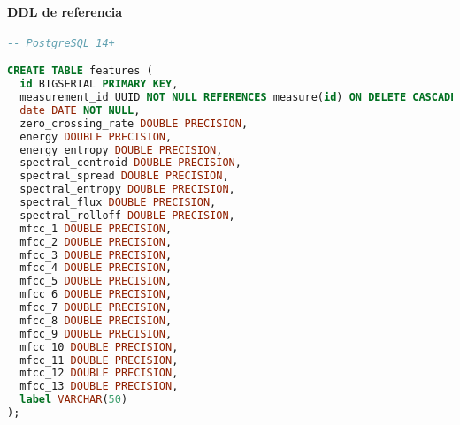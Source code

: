 \paragraph{DDL de referencia}

\begin{lstlisting}[language=SQL, label={lst:features-database-schema}, caption={Esquema de la tabla features en mind-database}]
-- PostgreSQL 14+

CREATE TABLE features (
  id BIGSERIAL PRIMARY KEY,
  measurement_id UUID NOT NULL REFERENCES measure(id) ON DELETE CASCADE,
  date DATE NOT NULL,
  zero_crossing_rate DOUBLE PRECISION,
  energy DOUBLE PRECISION,
  energy_entropy DOUBLE PRECISION,
  spectral_centroid DOUBLE PRECISION,
  spectral_spread DOUBLE PRECISION,
  spectral_entropy DOUBLE PRECISION,
  spectral_flux DOUBLE PRECISION,
  spectral_rolloff DOUBLE PRECISION,
  mfcc_1 DOUBLE PRECISION,
  mfcc_2 DOUBLE PRECISION,
  mfcc_3 DOUBLE PRECISION,
  mfcc_4 DOUBLE PRECISION,
  mfcc_5 DOUBLE PRECISION,
  mfcc_6 DOUBLE PRECISION,
  mfcc_7 DOUBLE PRECISION,
  mfcc_8 DOUBLE PRECISION,
  mfcc_9 DOUBLE PRECISION,
  mfcc_10 DOUBLE PRECISION,
  mfcc_11 DOUBLE PRECISION,
  mfcc_12 DOUBLE PRECISION,
  mfcc_13 DOUBLE PRECISION,
  label VARCHAR(50)
);
\end{lstlisting}

